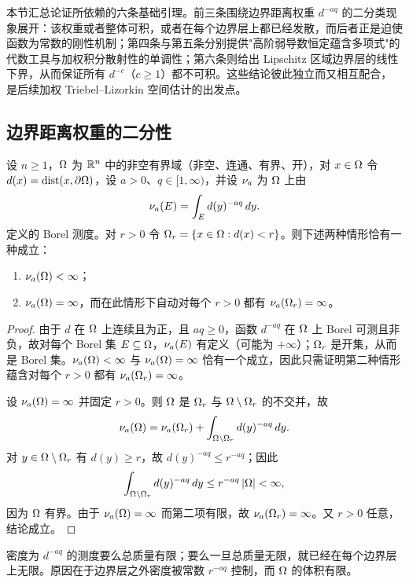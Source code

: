 
本节汇总论证所依赖的六条基础引理。前三条围绕边界距离权重 $d^{-aq}$ 的二分类现象展开：该权重或者整体可积，或者在每个边界层上都已经发散，而后者正是迫使函数为常数的刚性机制；第四条与第五条分别提供"高阶弱导数恒定蕴含多项式"的代数工具与加权积分散射性的单调性；第六条则给出 Lipschitz 区域边界层的线性下界，从而保证所有 $d^{-c}$（$c\ge 1$）都不可积。这些结论彼此独立而又相互配合，是后续加权 Triebel--Lizorkin 空间估计的出发点。

\subsection{边界距离权重的二分性}

\begin{lemma}[边界距离权重的二分性]
设 $n\ge 1$，$\Omega$ 为 $\mathbb{R}^n$ 中的非空有界域（非空、连通、有界、开），对 $x\in\Omega$ 令 $d(x)=\operatorname{dist}(x,\partial\Omega)$，设 $a>0$、$q\in[1,\infty)$，并设 $\nu_{a}$ 为 $\Omega$ 上由
\[
  \nu_{a}(E)=\int_E d(y)^{-aq}\,dy .
\]
定义的 Borel 测度。对 $r>0$ 令 $\Omega_{r}=\{x\in\Omega : d(x)<r\}$。则下述两种情形恰有一种成立：
\begin{enumerate}[label=(\Roman*)]
\item $\nu_{a}(\Omega)<\infty$；
\item $\nu_{a}(\Omega)=\infty$，而在此情形下自动对每个 $r>0$ 都有 $\nu_{a}(\Omega_{r})=\infty$。
\end{enumerate}
\end{lemma}

\begin{proof}
由于 $d$ 在 $\Omega$ 上连续且为正，且 $aq\ge 0$，函数 $d^{-aq}$ 在 $\Omega$ 上 Borel 可测且非负，故对每个 Borel 集 $E\subseteq\Omega$，$\nu_{a}(E)$ 有定义（可能为 $+\infty$）；$\Omega_{r}$ 是开集，从而是 Borel 集。$\nu_{a}(\Omega)<\infty$ 与 $\nu_{a}(\Omega)=\infty$ 恰有一个成立，因此只需证明第二种情形蕴含对每个 $r>0$ 都有 $\nu_{a}(\Omega_{r})=\infty$。

设 $\nu_{a}(\Omega)=\infty$ 并固定 $r>0$。则 $\Omega$ 是 $\Omega_{r}$ 与 $\Omega\setminus\Omega_{r}$ 的不交并，故
\[
  \nu_{a}(\Omega)=\nu_{a}(\Omega_{r})+\int_{\Omega\setminus\Omega_{r}} d(y)^{-aq}\,dy .
\]
对 $y\in\Omega\setminus\Omega_{r}$ 有 $d(y)\ge r$，故 $d(y)^{-aq}\le r^{-aq}$；因此
\[
  \int_{\Omega\setminus\Omega_{r}} d(y)^{-aq}\,dy\le r^{-aq}\,|\Omega|<\infty ,
\]
因为 $\Omega$ 有界。由于 $\nu_{a}(\Omega)=\infty$ 而第二项有限，故 $\nu_{a}(\Omega_{r})=\infty$。又 $r>0$ 任意，结论成立。
\end{proof}

\begin{remark}[直觉]
密度为 $d^{-aq}$ 的测度要么总质量有限；要么一旦总质量无限，就已经在每个边界层上无限。原因在于边界层之外密度被常数 $r^{-aq}$ 控制，而 $\Omega$ 的体积有限。
\end{remark}


